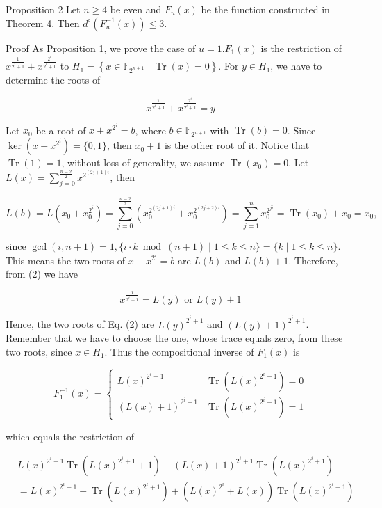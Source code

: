 \documentclass[10pt]{article}
\begin{document}
Proposition 2 Let $n \geq 4$ be even and $F_{u}(x)$ be the function constructed in Theorem 4. Then $d^{\circ}\left(F_{u}^{-1}(x)\right) \leq 3$.

Proof As Proposition 1, we prove the case of $u=1 . F_{1}(x)$ is the restriction of $x^{\frac{1}{2^{i}+1}}+x^{\frac{2^{i}}{2^{i}+1}}$ to $H_{1}=\left\{x \in \mathbb{F}_{2^{n+1}} \mid \operatorname{Tr}(x)=0\right\}$. For $y \in H_{1}$, we have to determine the roots of


\begin{equation*}
x^{\frac{1}{2^{i}+1}}+x^{\frac{2^{i}}{2^{i}+1}}=y \tag{2}
\end{equation*}


Let $x_{0}$ be a root of $x+x^{2^{i}}=b$, where $b \in \mathbb{F}_{2^{n+1}}$ with $\operatorname{Tr}(b)=0$. Since $\operatorname{ker}\left(x+x^{2^{i}}\right)= \{0,1\}$, then $x_{0}+1$ is the other root of it. Notice that $\operatorname{Tr}(1)=1$, without loss of generality, we assume $\operatorname{Tr}\left(x_{0}\right)=0$. Let $L(x)=\sum_{j=0}^{\frac{n-2}{2}} x^{2^{(2 j+1) i}}$, then

$$
L(b)=L\left(x_{0}+x_{0}^{2^{i}}\right)=\sum_{j=0}^{\frac{n-2}{2}}\left(x_{0}^{2^{(2 j+1) i}}+x_{0}^{2^{(2 j+2) i}}\right)=\sum_{j=1}^{n} x_{0}^{2^{j i}}=\operatorname{Tr}\left(x_{0}\right)+x_{0}=x_{0},
$$

since $\operatorname{gcd}(i, n+1)=1,\{i \cdot k \bmod (n+1) \mid 1 \leq k \leq n\}=\{k \mid 1 \leq k \leq n\}$. This means the two roots of $x+x^{2^{i}}=b$ are $L(b)$ and $L(b)+1$. Therefore, from (2) we have

$$
x^{\frac{1}{2^{i}+1}}=L(y) \text { or } L(y)+1
$$

Hence, the two roots of Eq. (2) are $L(y)^{2^{i}+1}$ and $(L(y)+1)^{2^{i}+1}$. Remember that we have to choose the one, whose trace equals zero, from these two roots, since $x \in H_{1}$. Thus the compositional inverse of $F_{1}(x)$ is

$$
F_{1}^{-1}(x)= \begin{cases}L(x)^{2^{i}+1} & \operatorname{Tr}\left(L(x)^{2^{i}+1}\right)=0 \\ (L(x)+1)^{2^{i}+1} & \operatorname{Tr}\left(L(x)^{2^{i}+1}\right)=1\end{cases}
$$

which equals the restriction of

$$
\begin{aligned}
& L(x)^{2^{i}+1} \operatorname{Tr}\left(L(x)^{2^{i}+1}+1\right)+(L(x)+1)^{2^{i}+1} \operatorname{Tr}\left(L(x)^{2^{i}+1}\right) \\
& =L(x)^{2^{i}+1}+\operatorname{Tr}\left(L(x)^{2^{i}+1}\right)+\left(L(x)^{2^{i}}+L(x)\right) \operatorname{Tr}\left(L(x)^{2^{i}+1}\right)
\end{aligned}
$$
\end{document}
